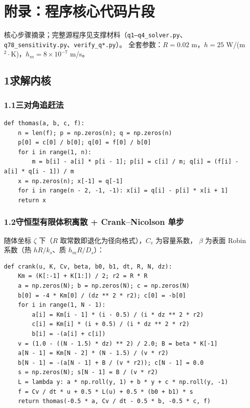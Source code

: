 \documentclass[12pt,a4paper]{ctexart}
\begin{document}
\section*{附录：程序核心代码片段}

\noindent 核心步骤摘录；完整源程序见支撑材料（\texttt{q1--q4\_solver.py}、\texttt{q78\_sensitivity.py}、\texttt{verify\_q*.py}）。
全套参数：$R=0.02$ m，$h=25$ W/(m$^2\!\cdot$K)，$h_m=8\times10^{-7}$ m/s。

\subsection*{1\quad 求解内核}

\subsubsection*{1.1\quad 三对角追赶法}

\begin{lstlisting}
def thomas(a, b, c, f):
    n = len(f); p = np.zeros(n); q = np.zeros(n)
    p[0] = c[0] / b[0]; q[0] = f[0] / b[0]
    for i in range(1, n):
        m = b[i] - a[i] * p[i - 1]; p[i] = c[i] / m; q[i] = (f[i] - a[i] * q[i - 1]) / m
    x = np.zeros(n); x[-1] = q[-1]
    for i in range(n - 2, -1, -1): x[i] = q[i] - p[i] * x[i + 1]
    return x
\end{lstlisting}

\subsubsection*{1.2\quad 守恒型有限体积离散 + Crank--Nicolson 单步}

\noindent 随体坐标 $\zeta$ 下（$R$ 取常数即退化为径向格式），$C_v$ 为容量系数，
$\beta$ 为表面 Robin 系数（热 $hR/k_s$、质 $h_mR/D_s$）：

\begin{lstlisting}
def crank(u, K, Cv, beta, b0, b1, dt, R, N, dz):
    Km = (K[:-1] + K[1:]) / 2; r2 = R * R
    a = np.zeros(N); b = np.zeros(N); c = np.zeros(N)
    b[0] = -4 * Km[0] / (dz ** 2 * r2); c[0] = -b[0]
    for i in range(1, N - 1):
        a[i] = Km[i - 1] * (i - 0.5) / (i * dz ** 2 * r2)
        c[i] = Km[i] * (i + 0.5) / (i * dz ** 2 * r2)
        b[i] = -(a[i] + c[i])
    v = (1.0 - ((N - 1.5) * dz) ** 2) / 2.0; B = beta * K[-1]
    a[N - 1] = Km[N - 2] * (N - 1.5) / (v * r2)
    b[N - 1] = -(a[N - 1] + B / (v * r2)); c[N - 1] = 0.0
    s = np.zeros(N); s[N - 1] = B / (v * r2)
    L = lambda y: a * np.roll(y, 1) + b * y + c * np.roll(y, -1)
    f = Cv / dt * u + 0.5 * L(u) + 0.5 * (b0 + b1) * s
    return thomas(-0.5 * a, Cv / dt - 0.5 * b, -0.5 * c, f)
\end{lstlisting}
\end{document}
